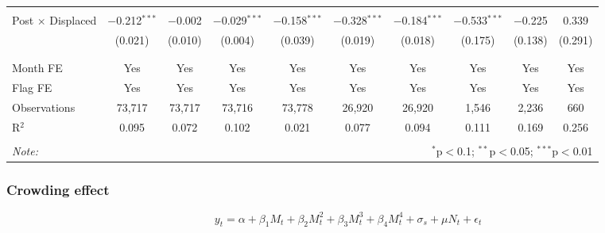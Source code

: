 \documentclass[12pt]{article}
\begin{document}
\begin{landscape}
\begin{table}[H]
\begin{tabular}{@{\extracolsep{1pt}}lccccccccc}
  & & & & & & & & & \\ 
 Post $\times$ Displaced & $-$0.212$^{***}$ & $-$0.002 & $-$0.029$^{***}$ & $-$0.158$^{***}$ & $-$0.328$^{***}$ & $-$0.184$^{***}$ & $-$0.533$^{***}$ & $-$0.225 & 0.339 \\ 
  & (0.021) & (0.010) & (0.004) & (0.039) & (0.019) & (0.018) & (0.175) & (0.138) & (0.291) \\ 
  & & & & & & & & & \\ 
\hline \\[-1.8ex] 
Month FE & Yes & Yes & Yes & Yes & Yes & Yes & Yes & Yes & Yes \\ 
Flag FE & Yes & Yes & Yes & Yes & Yes & Yes & Yes & Yes & Yes \\ 
Observations & 73,717 & 73,717 & 73,716 & 73,778 & 26,920 & 26,920 & 1,546 & 2,236 & 660 \\ 
R$^{2}$ & 0.095 & 0.072 & 0.102 & 0.021 & 0.077 & 0.094 & 0.111 & 0.169 & 0.256 \\ 
\hline 
\hline \\[-1.8ex] 
\textit{Note:}  & \multicolumn{9}{r}{$^{*}$p$<$0.1; $^{**}$p$<$0.05; $^{***}$p$<$0.01} \\ 
\end{tabular} 
\end{table} 
\end{landscape}

\subsubsection{Crowding effect}

\begin{equation}
y_t = \alpha + \beta_1 M_t + \beta_2 M_t^2 + \beta_3 M_t^3 + \beta_4 M_t ^4 + \sigma_s + \mu N_t + \epsilon_t
\label{eqn:sp_corr}
\end{equation}
\end{document}
